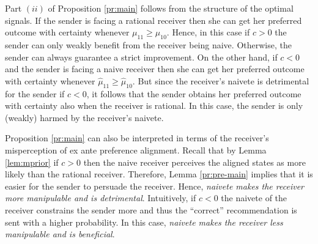 \documentclass[12pt,english]{article}
\theoremstyle{plain}
\begin{document}
Part $(ii)$ of Proposition \ref{pr:main} follows from the structure of the optimal signals. 
If the sender is facing a rational receiver then she can get her preferred outcome with certainty whenever $\mu_{11}\geq\mu_{10}$. 
Hence, in this case if $c>0$ the sender can only weakly benefit from the receiver being naive. 
Otherwise, the sender can always guarantee a strict improvement. 
On the other hand, if $c<0$ and the sender is facing a naive receiver then she can get her preferred outcome with certainty whenever $\hat\mu_{11}\geq\hat\mu_{10}$.
But since the receiver's naivete is detrimental for the sender if $c<0$, it follows that the sender obtains her preferred outcome with certainty also when the receiver is rational.
In this case, the sender is only (weakly) harmed by the receiver's naivete. 

Proposition \ref{pr:main} can also be interpreted in terms of the receiver's misperception of ex ante preference alignment. 
Recall that by Lemma \ref{lem:mprior} if $c>0$ then the naive receiver perceives the aligned states as more likely than the rational receiver. 
Therefore, Lemma \ref{pr:pre-main} implies that it is easier for the sender to persuade the receiver. 
Hence, \emph{naivete makes the receiver more manipulable and is detrimental}. 
Intuitively, if $c<0$ the naivete of the receiver constrains the sender more and thus the ``correct'' recommendation is sent with a higher probability. 
In this case, \emph{naivete makes the receiver less manipulable and is beneficial}.
\end{document}
